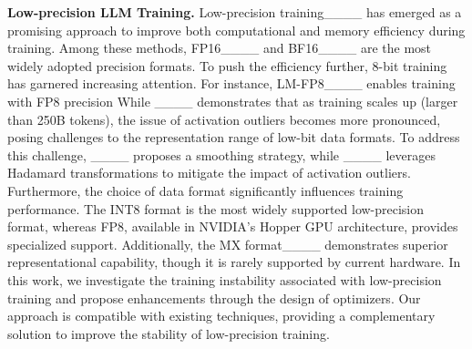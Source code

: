 \textbf{Low-precision LLM Training.} Low-precision training____ has emerged as a promising approach to improve both computational and memory efficiency during training. Among these methods, FP16____ and BF16____ are the most widely adopted precision formats. To push the efficiency further, 8-bit training has garnered increasing attention. For instance, LM-FP8____ enables training with FP8 precision While ____ demonstrates that as training scales up (larger than 250B tokens), the issue of activation outliers becomes more pronounced, posing challenges to the representation range of low-bit data formats. To address this challenge, ____ proposes a smoothing strategy, while ____ leverages Hadamard transformations to mitigate the impact of activation outliers. Furthermore, the choice of data format significantly influences training performance. The INT8 format is the most widely supported low-precision format, whereas FP8, available in NVIDIA’s Hopper GPU architecture, provides specialized support. Additionally, the MX format____ demonstrates superior representational capability, though it is rarely supported by current hardware. In this work, we investigate the training instability associated with low-precision training and propose enhancements through the design of optimizers. Our approach is compatible with existing techniques, providing a complementary solution to improve the stability of low-precision training.
